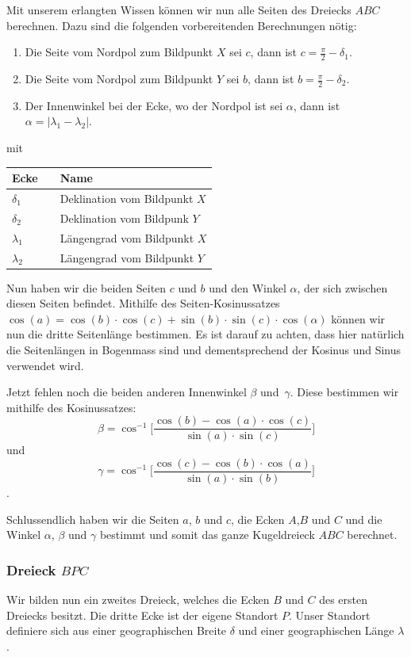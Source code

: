 Mit unserem erlangten Wissen können wir nun alle Seiten des Dreiecks $ABC$ berechnen.
Dazu sind die folgenden vorbereitenden Berechnungen nötig:
\begin{enumerate}
	\item Die Seite vom Nordpol zum Bildpunkt $X$ sei $c$, dann ist $c = \frac{\pi}{2} - \delta_1$.  
	\item Die Seite vom Nordpol zum Bildpunkt $Y$ sei $b$, dann ist $b = \frac{\pi}{2} - \delta_2$.
	\item Der Innenwinkel bei der Ecke, wo der Nordpol ist sei $\alpha$, dann ist $ \alpha = |\lambda_1 - \lambda_2|$.
\end{enumerate}
mit 
\begin{center}
	\begin{tabular}{ l l l }
		Ecke && Name  \\ 
		\hline
		$\delta_1$ && Deklination vom Bildpunkt $X$ \\  
		$\delta_2$ && Deklination vom Bildpunk $Y$ \\
		$\lambda_1 $&& Längengrad vom Bildpunkt $X$\\
		$\lambda_2$ && Längengrad vom Bildpunkt $Y$
	\end{tabular}
\end{center}

Nun haben wir die beiden Seiten $c$ und $b$ und den Winkel $\alpha$, der sich zwischen diesen Seiten befindet. 
Mithilfe des Seiten-Kosinussatzes 
$\cos(a) = \cos(b)\cdot \cos(c) + \sin(b) \cdot \sin(c)\cdot \cos(\alpha)$ 
können wir nun die dritte Seitenlänge bestimmen. 
Es ist darauf zu achten, dass hier natürlich die Seitenlängen in Bogenmass sind und dementsprechend der Kosinus und Sinus verwendet wird. 

Jetzt fehlen noch die beiden anderen Innenwinkel $\beta$ und\ $\gamma$.
Diese bestimmen wir mithilfe des Kosinussatzes:
\[
\beta=\cos^{-1}  \bigg[\frac{\cos(b)-\cos(a) \cdot \cos(c)}{\sin(a) \cdot \sin(c)}\bigg]
\]
und
\[
\gamma =  \cos^{-1}  \bigg[\frac{\cos(c)-\cos(b) \cdot \cos(a)}{\sin(a) \cdot \sin(b)}\bigg]
\].

Schlussendlich haben wir die Seiten $a$, $b$ und $c$, die Ecken $A$,$B$ und $C$ und die Winkel $\alpha$, $\beta$  und  $\gamma$ bestimmt und somit das ganze Kugeldreieck $ABC$ berechnet.

\subsubsection{Dreieck $BPC$}
Wir bilden nun ein zweites Dreieck, welches die Ecken $B$ und $C$ des ersten Dreiecks besitzt. 
Die dritte Ecke ist der eigene Standort $P$.
Unser Standort definiere sich aus einer geographischen Breite
$\delta$ und einer geographischen Länge $\lambda$.

